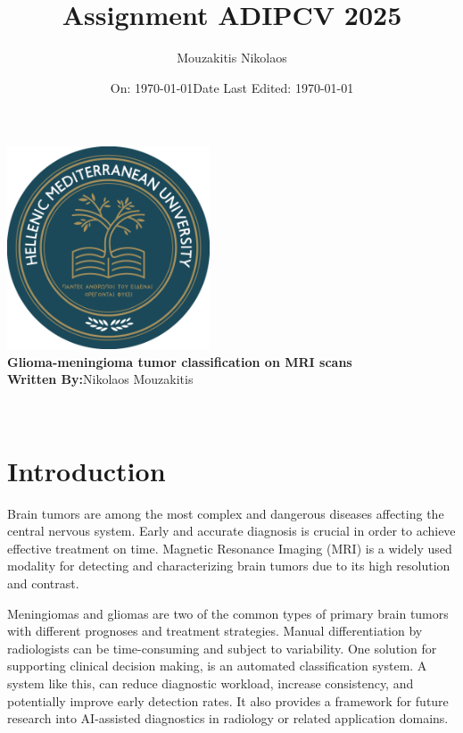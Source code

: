 \documentclass[11pt,a4paper]{article}
\title{\LARGE \textbf{Assignment ADIPCV 2025}}
\author{Mouzakitis Nikolaos}
\date{\large On: \today}
\begin{document}
\makeatletter
\begin{titlepage}
    \centering
    \vspace*{1cm}
       { \includegraphics[width=6cm]{ELMEPA.png}}\\[1cm]

    {\LARGE \textbf{Glioma-meningioma tumor classification on MRI scans }}\\[1cm]
    
    
    \textbf{Written By:}{Nikolaos Mouzakitis}\\[1cm]
    \date{\large Date Last Edited: \today}
    {\@date\\}
\end{titlepage}
\makeatother

\section{Introduction}

Brain tumors are among the most complex and dangerous 
diseases affecting the central nervous system. 
Early and accurate diagnosis is crucial in order to achieve effective treatment on time. 
Magnetic Resonance Imaging (MRI) is a widely used modality for detecting 
and characterizing brain tumors due to its high resolution and contrast.

Meningiomas and gliomas are two of the common types of primary brain tumors with 
different prognoses and treatment strategies. 
Manual differentiation by radiologists can be time-consuming 
and subject to variability. 
One solution for supporting clinical decision making, is an automated classification system.
A system like this, can reduce diagnostic workload, 
increase consistency, and potentially improve early detection rates. 
It also provides a framework for future research 
into AI-assisted diagnostics in radiology or related application domains.
\end{document}
